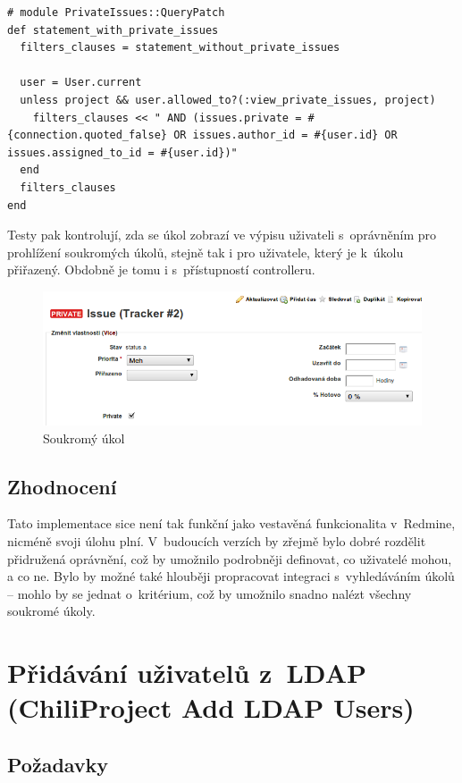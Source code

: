 \documentclass[thesis=B,czech]{FITthesis}[2012/05/02]
\begin{document}
\begin{lstlisting}
# module PrivateIssues::QueryPatch
def statement_with_private_issues
  filters_clauses = statement_without_private_issues

  user = User.current
  unless project && user.allowed_to?(:view_private_issues, project)
    filters_clauses << " AND (issues.private = #{connection.quoted_false} OR issues.author_id = #{user.id} OR issues.assigned_to_id = #{user.id})"
  end
  filters_clauses
end
\end{lstlisting}
Testy pak kontrolují, zda se úkol zobrazí ve výpisu uživateli
s~oprávněním pro prohlížení soukromých úkolů, stejně tak i pro uživatele,
který je k~úkolu přiřazený. Obdobně je tomu i s~přístupností
controlleru.

\begin{figure}[tbp]
\centering
\centerline{\includegraphics[width=1.2\textwidth]{issues-gui1.png}}
\caption{Soukromý úkol}
\end{figure}

\subsection{Zhodnocení}

Tato implementace sice není tak funkční jako vestavěná funkcionalita
v~Redmine, nicméně svoji úlohu plní. V~budoucích verzích by zřejmě bylo
dobré rozdělit přidružená oprávnění, což by umožnilo podrobněji
definovat, co uživatelé mohou, a co ne. Bylo by možné také hlouběji
propracovat integraci s~vyhledáváním úkolů -- mohlo by se jednat
o~kritérium, což by umožnilo snadno nalézt všechny soukromé úkoly.

\section[Přidávání uživatelů z~LDAP]{Přidávání uživatelů z~LDAP (ChiliProject Add LDAP Users)}
\label{sec:add_ldap_users}

\subsection{Požadavky}
\end{document}
